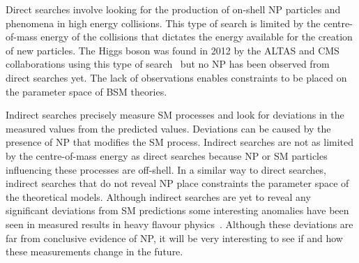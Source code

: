 Direct searches involve looking for the production of on-shell NP particles and phenomena in high energy collisions. 
This type of search is limited by the centre-of-mass energy of the collisions that dictates the energy available for the creation of new particles. 
The Higgs boson was found in 2012 by the ALTAS and CMS collaborations using this type of search~\cite{Chatrchyan:2012xdj,Aad:2012tfa} but no NP has been observed from direct searches yet. The lack of observations enables constraints to be placed on the parameter space of BSM theories.


Indirect searches precisely measure SM processes and look for deviations in the measured values from the predicted values. Deviations can be caused by the presence of NP that modifies the SM process. 
Indirect searches are not as limited by the centre-of-mass energy as direct searches because NP or SM particles influencing these processes are off-shell. %
In a similar way to direct searches, indirect searches that do not reveal NP place constraints the parameter space of the theoretical models. Although indirect searches are yet to reveal any significant deviations from SM predictions some interesting anomalies have been seen in measured results in heavy flavour physics~\cite{PhysRevLett.118.111801,Aaij:2014pli,Aaij:2015yra,Lees:2013uzd,Huschle:2015rga,Lees:2012xj,Aaij:2015oid,Aaij:2015esa,PhysRevLett.113.151601, R_K_star}. %
Although these deviations are far from conclusive evidence of NP, it will be very interesting to see if and how these measurements change in the future.


